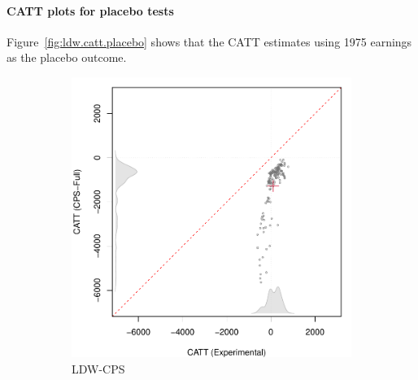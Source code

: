 \documentclass[letterpaper,12pt,leqno]{article}
\begin{document}
\clearpage

\paragraph{CATT plots for placebo tests} Figure~\ref{fig:ldw.catt.placebo} shows that the CATT estimates using 1975 earnings as the placebo outcome. 

\begin{figure}[!ht]
    \caption{Placebo Tests using LDW Data: Experimental vs. Nonexperimental}\label{fig:ldw.catt.placebo}
    \vspace{-1em}
    \begin{minipage}[c]{1\textwidth}
        \centering
        \begin{subfigure}{0.4\linewidth}
            \includegraphics[width=\linewidth]{catt_placebo_cps.pdf}
            \caption{LDW-CPS}
        \end{subfigure}
        \begin{subfigure}{0.4\linewidth}

\end{subfigure}
\end{minipage}
\end{figure}
\end{document}

